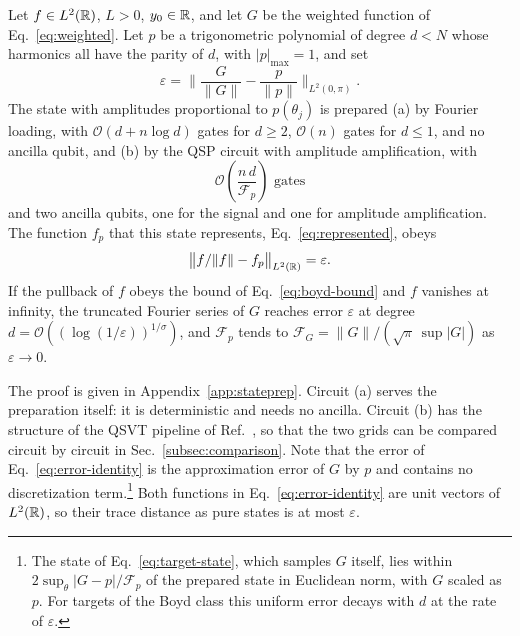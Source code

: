 \begin{theorem}
	\label{thm:stateprep}
	Let $f\in L^2(\mathbb{R})$, $L>0$, $y_0\in\mathbb{R}$, and let $G$ be the
	weighted function of Eq.~\eqref{eq:weighted}.  Let $p$ be a
	trigonometric polynomial of degree $d<N$ whose harmonics all
	have the parity of $d$, with $|p|_{\max}=1$, and set
	\begin{equation}
		\varepsilon=\biggl\|\frac{G}{\|G\|}-\frac{p}{\|p\|}
		\biggr\|_{L^2(0,\pi)}.
		\label{eq:eps-def}
	\end{equation}
	The state with amplitudes proportional to $p(\theta_j)$ is
	prepared (a) by Fourier loading, with
	$\mathcal{O}(d+n\log d)$ gates for $d\ge2$, $\mathcal{O}(n)$
	gates for $d\le1$, and no ancilla qubit, and (b) by
	the QSP circuit with amplitude amplification, with
	\begin{equation}
		\mathcal{O}\!\left(\frac{n\,d}{\mathcal{F}_p}\right)
		\text{ gates}
		\label{eq:stateprep-cost}
	\end{equation}
	and two ancilla qubits, one for the signal and one for
	amplitude amplification.  The function $f_p$ that this state
	represents, Eq.~\eqref{eq:represented}, obeys
	\begin{equation}
		\bigl\|f/\|f\|-f_p\bigr\|_{L^2(\mathbb{R})}=\varepsilon .
		\label{eq:error-identity}
	\end{equation}
	If the pullback of $f$ obeys the bound of
	Eq.~\eqref{eq:boyd-bound} and $f$ vanishes at infinity, the
	truncated Fourier series of $G$
	reaches error $\varepsilon$ at degree
	$d=\mathcal{O}((\log(1/\varepsilon))^{1/\sigma})$, and
	$\mathcal{F}_p$ tends to
	$\mathcal{F}_G=\|G\|/(\sqrt{\pi}\,\sup|G|)$ as
	$\varepsilon\to0$.
\end{theorem}

The proof is given in Appendix~\ref{app:stateprep}.  Circuit (a)
serves the preparation itself: it is deterministic and needs no
ancilla.  Circuit (b) has the
structure of the QSVT pipeline of
Ref.~\cite{McArdleGilyenBerta2025}, so that the two grids can be
compared circuit by circuit in Sec.~\ref{subsec:comparison}.  Note that
the error of
Eq.~\eqref{eq:error-identity} is the approximation error of $G$ by
$p$ and contains no discretization term.\footnote{The state of
	Eq.~\eqref{eq:target-state}, which samples $G$ itself, lies
	within $2\sup_\theta|G-p|/\mathcal{F}_p$ of the prepared state
	in Euclidean norm, with $G$ scaled as $p$.  For targets of the
	Boyd class this uniform error decays with $d$ at the rate of
	$\varepsilon$.}  Both functions in
Eq.~\eqref{eq:error-identity} are unit vectors of $L^2(\mathbb{R})$, so
their trace distance as pure states is at most $\varepsilon$.

